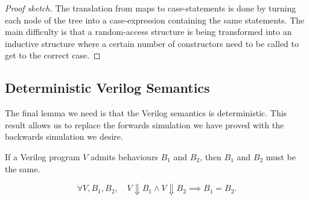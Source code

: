 \begin{proof}[Proof sketch]
  The translation from maps to case-statements is done by turning each node of the tree into a case-expression containing the same statements.  The main difficulty is that a random-access structure is being transformed into an inductive structure where a certain number of constructors need to be called to get to the correct case.
\end{proof}

\subsection{Deterministic Verilog Semantics}\label{sec:proof:deterministic}

The final lemma we need is that the Verilog semantics is deterministic. This result allows us to replace the forwards simulation we have proved with the backwards simulation we desire.

\begin{lemma}\label{lemma:deterministic}
  If a Verilog program $V$ admits behaviours $B_1$ and $B_2$, then $B_1$ and $B_2$ must be the same.

  \begin{equation*}
    \forall V, B_{1}, B_{2},\quad V \Downarrow B_{1} \land V \Downarrow B_{2} \implies B_{1} = B_{2}.
  \end{equation*}
\end{lemma}

